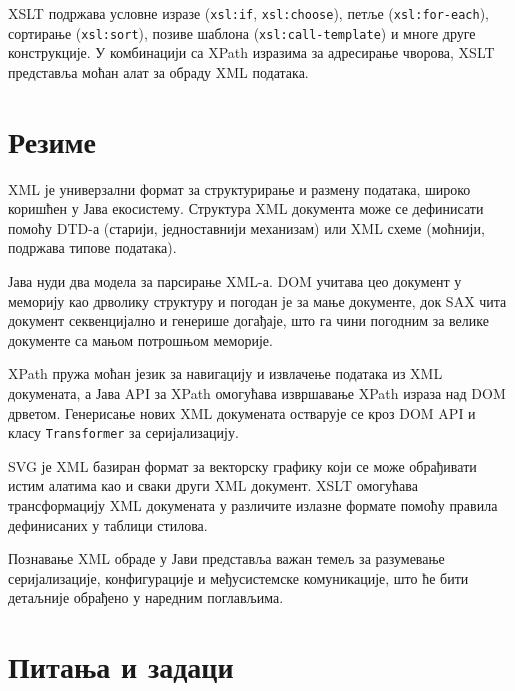 XSLT подржава условне изразе (\texttt{xsl:if}, \texttt{xsl:choose}), петље (\texttt{xsl:for-each}), сортирање (\texttt{xsl:sort}), позиве шаблона (\texttt{xsl:call-template}) и многе друге конструкције. У комбинацији са XPath изразима за адресирање чворова, XSLT представља моћан алат за обраду XML података.


\section{Резиме}

XML је универзални формат за структурирање и размену података, широко коришћен у Јава екосистему. Структура XML документа може се дефинисати помоћу DTD-а (старији, једноставнији механизам) или XML схеме (моћнији, подржава типове података).

Јава нуди два модела за парсирање XML-а. DOM учитава цео документ у меморију као дрволику структуру и погодан је за мање документе, док SAX чита документ секвенцијално и генерише догађаје, што га чини погодним за велике документе са мањом потрошњом меморије.

XPath пружа моћан језик за навигацију и извлачење података из XML докумената, а Јава API за XPath омогућава извршавање XPath израза над DOM дрветом. Генерисање нових XML докумената остварује се кроз DOM API и класу \texttt{Transformer} за серијализацију.

SVG је XML базиран формат за векторску графику који се може обрађивати истим алатима као и сваки други XML документ. XSLT омогућава трансформацију XML докумената у различите излазне формате помоћу правила дефинисаних у таблици стилова.

Познавање XML обраде у Јави представља важан темељ за разумевање серијализације, конфигурације и међусистемске комуникације, што ће бити детаљније обрађено у наредним поглављима.


\section{Питања и задаци}

